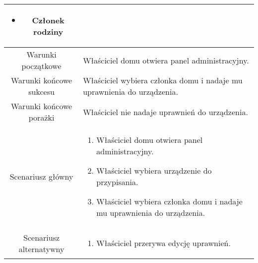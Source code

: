 \documentclass{article}
\begin{document}
\begin{enumerate}
\begin{enumerate}
\begin{table}[H]
\begin{tabular}{|c|p{7cm}|}
\begin{itemize}
\item Członek rodziny\end{itemize}                                                                                                                                                \\
						\hline
						Warunki początkowe      & Właściciel domu otwiera panel administracyjny.                                                                                                                                                                          \\
						\hline
						Warunki końcowe sukcesu & Właściciel wybiera członka domu i nadaje mu uprawnienia do urządzenia.                                                                                                                                                  \\
						\hline
						Warunki końcowe porażki & Właściciel nie nadaje uprawnień do urządzenia.                                                                                                                                                                          \\
						\hline
						Scenariusz główny       & \begin{enumerate}\item Właściciel domu otwiera panel administracyjny.

\item Właściciel wybiera urządzenie do przypisania.

\item Właściciel wybiera członka domu i nadaje mu uprawnienia do urządzenia.\end{enumerate} \\
						\hline
						Scenariusz alternatywny & \begin{enumerate}\item Właściciel przerywa edycję uprawnień.\end{enumerate}                                                                                                                                             \\
						\hline
					\end{tabular}
				\end{table}


\end{enumerate}
\end{enumerate}
\end{document}
